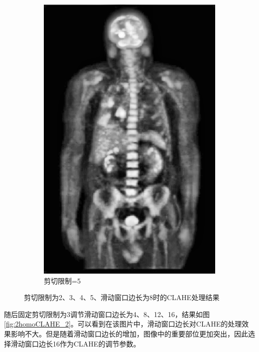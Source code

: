 \documentclass[a4paper]{ctexart}
\newcommand{\outwfour}{0.23\textwidth}
\begin{document}
\begin{spacing}{1.35}
\begin{figure}[htbp]
\begin{subfigure}[t]{\outwfour}
			\includegraphics[width=\textwidth]{figure/2_clip_limit_5.png}
			\caption{剪切限制=5}
		\end{subfigure}
		\caption{剪切限制为2、3、4、5、滑动窗口边长为8时的CLAHE处理结果}
		\label{fig:2homoCLAHE_1}
	\end{figure}
	随后固定剪切限制为3调节滑动窗口边长为4、8、12、16，结果如图\ref{fig:2homoCLAHE_2}。可以看到在该图片中，滑动窗口边长对CLAHE的处理效果影响不大。但是随着滑动窗口边长的增加，图像中的重要部位更加突出，因此选择滑动窗口边长16作为CLAHE的调节参数。
	\begin{figure}[htbp]
		\centering
		\begin{subfigure}[t]{\outwfour}
			\centering

\end{subfigure}
\end{figure}
\end{spacing}
\end{document}

